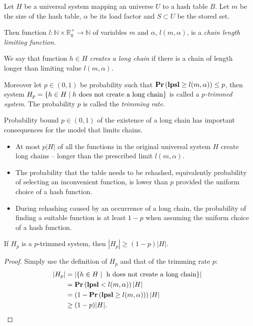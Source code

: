 \begin{definition}
Let $H$ be a universal system mapping an universe $U$ to a hash table $B$. Let $m$ be the size of the hash table, $\alpha$ be its load factor and $S \subset U$ be the stored set. 

Then function $l: \mathbb{N} \times \mathbb{R}_{0}^{+} \rightarrow \mathbb{N}$ of variables $m$ and $\alpha$, $l(m, \alpha)$, is a \emph{chain length limiting function}. 

We say that function $h \in H$ \emph{creates a long chain} if there is a chain of length longer than limiting value $l(m, \alpha)$.

Moreover let $p \in (0, 1)$ be probability such that $\mathbf{Pr}\left(\mathbf{lpsl} \geq l(m, \alpha)\right) \leq p$, then system $H_p = \{ h \in H \mid h \text{ does not create a long chain} \}$ is called a \emph{$p$-trimmed system}. The probability $p$ is called the \emph{trimming rate}.
\end{definition}

Probability bound $p \in (0, 1)$ of the existence of a long chain has important consequences for the model that limits chains.
\begin{itemize}
\item At most $p|H|$ of all the functions in the original universal system $H$ create long chains -- longer than the prescribed limit $l(m, \alpha)$. 
\item The probability that the table needs to be rehashed, equivalently probability of selecting an inconvenient function, is lower than $p$ provided the uniform choice of a hash function.
\item During rehashing caused by an occurrence of a long chain, the probability of finding a suitable function is at least $1 - p$ when assuming the uniform choice of a hash function.
\end{itemize}

\begin{lemma}
\label{lemma-size-of-trimmed-system}
If $H_p$ is a $p$-trimmed system, then $|H_p| \geq (1 - p)|H|$.
\end{lemma}
\begin{proof}
Simply use the definition of $H_p$ and that of the trimming rate $p$:
\[
\begin{split}
|H_p|
	& = |\lbrace h \in H \mid \text{ h does not create a long chain} \rbrace| \\
	& =\mathbf{Pr}\left(\mathbf{lpsl} < l(m, \alpha)\right) |H| \\
	& = \left(1 - \mathbf{Pr}\left(\mathbf{lpsl} \geq l(m, \alpha)\right)\right) |H| \\
	& \geq (1 - p)|H| \text{.}
\end{split}
\]
\end{proof}

